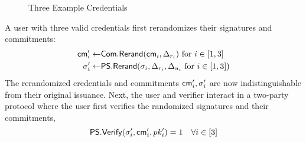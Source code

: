 \begin{figure}
        \begin{pchstack}[boxed, center, space=4em]
            \begin{pcvstack}
            \end{pcvstack}
            \pcvspace
            \begin{pcvstack}
            \end{pcvstack}
            \pcvspace
            \begin{pcvstack}
            \end{pcvstack}
        \end{pchstack}
    \caption{Three Example Credentials}
    \label{fig:three-creds}
\end{figure}

\noindent A user with three valid credentials first rerandomizes their signatures and commitments:
\begin{align*}
    \mathsf{cm}_i' \gets& \mathsf{Com.Rerand}(\mathsf{cm}_i, \Delta_{r_i}) \text{ for } i \in [1,3] \\
    \sigma_i' \gets& \mathsf{PS.Rerand}(\sigma_i, \Delta_{r_i}, \Delta_{u_i} \text{ for } i \in [1,3])
\end{align*}
The rerandomized credentials and commitments $\mathsf{cm}_i', \sigma_i'$ are now indistinguishable from their original issuance.  
Next, the user and verifier interact in a two-party protocol where the user first verifies the randomized signatures and their commitments, 
\[
\mathsf{PS.Verify}(\sigma_i',\mathsf{cm}_i',pk_i') = 1 \quad \forall i \in [3]
\]

